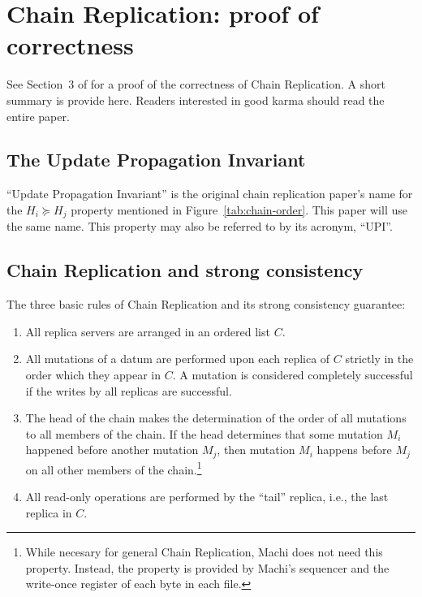 \documentclass[preprint,10pt]{sigplanconf}
\begin{document}
\section{Chain Replication: proof of correctness}
\label{sec:cr-proof}

See Section~3 of \cite{chain-replication} for a proof of the
correctness of Chain Replication.  A short summary is provide here.
Readers interested in good karma should read the entire paper.

\subsection{The Update Propagation Invariant}
\label{sub:upi}

``Update Propagation Invariant'' is the original chain replication
paper's name for the
$H_i \succeq H_j$
property mentioned in Figure~\ref{tab:chain-order}.
This paper will use the same name.
This property may also be referred to by its acronym, ``UPI''.

\subsection{Chain Replication and strong consistency}

The three basic rules of Chain Replication and its strong
consistency guarantee:

\begin{enumerate}

\item All replica servers are arranged in an ordered list $C$.

\item All mutations of a datum are performed upon each replica of $C$
  strictly in the order which they appear in $C$.  A mutation is considered
  completely successful if the writes by all replicas are successful.

\item The head of the chain makes the determination of the order of
  all mutations to all members of the chain.  If the head determines
  that some mutation $M_i$ happened before another mutation $M_j$,
  then mutation $M_i$ happens before $M_j$ on all other members of
  the chain.\footnote{While necesary for general Chain Replication,
    Machi does not need this property.  Instead, the property is
    provided by Machi's sequencer and the write-once register of each
    byte in each file.}

\item All read-only operations are performed by the ``tail'' replica,
  i.e., the last replica in $C$.

\end{enumerate}
\end{document}
